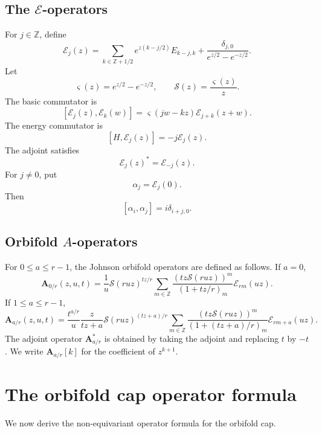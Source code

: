 \documentclass[letterpaper,12pt]{amsart}
\theoremstyle{definition}
\newcommand{\Scal}{\mathcal S}
\newcommand{\Ecal}{\mathcal E}
\newcommand{\Z}{\mathbb Z}
\newcommand{\vars}{\varsigma}
\numberwithin{equation}{section}
\begin{document}
\subsection{The \texorpdfstring{\(\mathcal E\)}{E}-operators}

For \(j\in\Z\), define
\begin{equation*}
  \Ecal_j(z)=
  \sum_{k\in\Z+1/2}e^{z(k-j/2)}E_{k-j,k}
  +\frac{\delta_{j,0}}{e^{z/2}-e^{-z/2}}.
\end{equation*}
Let
\[
  \vars(z)=e^{z/2}-e^{-z/2},
  \qquad
  \Scal(z)=\frac{\vars(z)}{z}.
\]
The basic commutator is
\begin{equation}\label{eq:E-commutator}
  [\Ecal_j(z),\Ecal_k(w)]
  =\vars(jw-kz)\Ecal_{j+k}(z+w).
\end{equation}
The energy commutator is
\[
  [H,\Ecal_j(z)]=-j\Ecal_j(z).
\]
The adjoint satisfies
\[ 
  \Ecal_j(z)^*=\Ecal_{-j}(z).
\]
For \(j\ne0\), put
\[
  \alpha_j=\Ecal_j(0).
\]
Then
\[
  [\alpha_i,\alpha_j]=i\delta_{i+j,0}.
\]

\subsection{Orbifold \texorpdfstring{\(A\)}{A}-operators}

For \(0\le a\le r-1\), the Johnson orbifold operators are defined as follows.  If \(a=0\),
\begin{equation*}
  \boldsymbol A_{0/r}(z,u,t)
  =\frac1u\Scal(ruz)^{tz/r}
  \sum_{m\in\Z}
  \frac{(tz\Scal(ruz))^m}{(1+tz/r)_m}
  \Ecal_{rm}(uz).
\end{equation*}
If \(1\le a\le r-1\),
\begin{equation*}
  \boldsymbol A_{a/r}(z,u,t)
  =\frac{t^{a/r}}u\frac{z}{tz+a}
  \Scal(ruz)^{(tz+a)/r}
  \sum_{m\in\Z}
  \frac{(tz\Scal(ruz))^m}{(1+(tz+a)/r)_m}
  \Ecal_{rm+a}(uz).
\end{equation*}
The adjoint operator \(\boldsymbol A_{a/r}^*\) is obtained by taking the adjoint and replacing \(t\) by \(-t\).  We write \(\boldsymbol A_{a/r}[k]\) for the coefficient of \(z^{k+1}\).




\section{The orbifold cap operator formula}\label{sec:cap-formula}
We now derive the non-equivariant operator formula for the orbifold cap.
\end{document}
